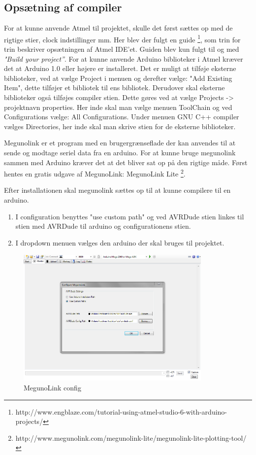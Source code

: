 \subsection{Opsætning af compiler}


For at kunne anvende Atmel til projektet, skulle det først sættes op med de rigtige stier, clock indstillinger mm. Her blev der fulgt en guide \footnote{http://www.engblaze.com/tutorial-using-atmel-studio-6-with-arduino-projects/}, som trin for trin beskriver opsætningen af Atmel IDE'et. Guiden blev kun fulgt til og med \textit{"Build your project”}. 
For at kunne anvende Arduino biblioteker i Atmel kræver det at Arduino 1.0 eller højere er installeret. Det er muligt at tilføje eksterne biblioteker, ved at vælge Project i menuen og derefter vælge: "Add Existing Item", dette tilføjer et bibliotek til ens bibliotek. Derudover skal eksterne biblioteker også tilføjes compiler stien. Dette gøres ved at vælge Projects -> projektnavn properties. Her inde skal man vælge menuen ToolChain og ved Configurations vælge: All Configurations. Under menuen GNU C++ compiler vælges Directories, her inde skal man skrive stien for de eksterne biblioteker.

Megunolink er et program med en brugergrænseflade der kan anvendes til at sende og modtage seriel data fra en arduino.
For at kunne bruge megunolink sammen med Arduino kræver det at det bliver sat op på den rigtige måde.
Først hentes en gratis udgave af MegunoLink: MegunoLink Lite \footnote{http://www.megunolink.com/megunolink-lite/megunolink-lite-plotting-tool/}.

Efter installationen skal megunolink sættes op til at kunne compilere til en arduino.

\begin{enumerate}
	\item I configuration benyttes "use custom path" og ved AVRDude stien linkes til stien med AVRDude til arduino og configurationens stien. 
	\item I dropdown menuen vælges den arduino der skal bruges til projektet.
\end{enumerate}

\begin{figure}[H]
	\centering
	\includegraphics[width=0.85\textwidth]{Billeder/implementation/megunolink_config.png}
	\vspace{-.5cm}
	\caption{MegunoLink config}
	\label{fig:meglinkconf}
\end{figure}

